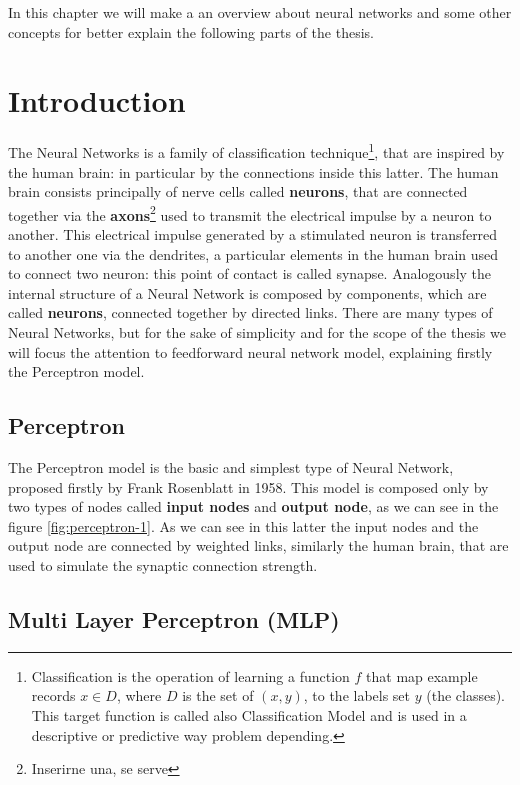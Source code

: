 \label{sl-nn}
In this chapter we will make a an overview about neural networks and some other concepts  for better explain the following parts of the thesis.

\section{Introduction}
The Neural Networks is a family of classification technique\footnote{Classification is the operation of learning a function \textbf{$f$} that map example records \textbf{$x \in D$}, where $D$ is the set of \textbf{$(x, y)$}, to the labels set \textbf{$y$} (the classes). This target function is called also Classification Model and is used in a descriptive or predictive way problem depending.}, that are inspired by the human brain: in particular by the connections inside this latter. The human brain consists principally of nerve cells called \textbf{neurons}, that are connected together via the \textbf{axons}\footnote{Inserirne una, se serve} used to transmit the electrical impulse by a neuron to another. This electrical impulse generated by a stimulated neuron is transferred to another one via the dendrites, a particular elements in the human brain used to connect two neuron: this point of contact is called synapse. \newline Analogously the internal structure of a Neural Network is composed by components, which are called \textbf{neurons}, connected together by directed links. There are many types of Neural Networks, but for the sake of simplicity and  for the scope of the thesis we will focus the attention to feedforward neural network model, explaining firstly the Perceptron model.
\subsection{	Perceptron}
The Perceptron model is the basic and simplest type of Neural Network, proposed firstly by Frank Rosenblatt in 1958. This model is composed only by two types of nodes called \textbf{input nodes} and \textbf{output node}, as we can see in the figure \ref{fig:perceptron-1}. As we can see in this latter the input nodes and the output node are connected by weighted links, similarly the human brain, that are used to simulate the synaptic connection strength.

\subsection{Multi Layer Perceptron (MLP)}
